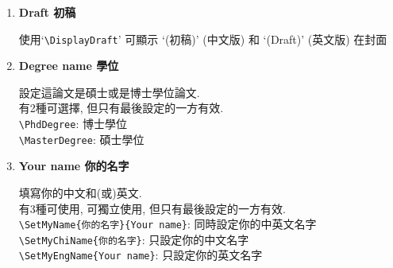 \begin{enumerate}
{    而如果覺得自動產生出來的題目斷行位置不適合, 可以手動加`\verb|\\|'來強制斷行. 如:\\
    \verb|\SetTitle{題目題目}{Title Tooooooooooo \\ Longgggggggggggg}|\\

    有3種可使用, 可獨立使用, 但只有最後設定的一方有效\\
    \verb|\SetTitle{你的題目}{Your Title}|: 同時設定中英文題目\\
    \verb|\SetChiTitle{你的題目}|: 只設定中文題目\\
    \verb|\SetEngTitle{Your Title}|: 只設定英文題目\\

    如:\\
    \verb|\SetTitle %|\\
    \verb|{中文題目中文題目} %|\\
    \verb|{Your Title Your Title}|\\
    \verb|'%'|是必須的, 是用來跟LaTex說這3行是同一句話.

    或\\
    \verb|\SetChiTitle{中文題目中文題目}|\\
    \verb|\SetEngTitle{Your Title \\ Your Title}|

    圖書館說不管你是編寫中英混合或全英文版, 都\textbf{必須}同時存在中英題目.
  } %

  \item
  {
    \textbf{Draft 初稿}

    使用`\verb|\DisplayDraft|' 可顯示 `(初稿)' (中文版) 和 `(Draft)' (英文版) 在封面
  } %

  \item
  {
    \textbf{Degree name 學位}

    設定這論文是碩士或是博士學位論文.\\
    有2種可選擇, 但只有最後設定的一方有效.\\
    \verb|\PhdDegree|: 博士學位\\
    \verb|\MasterDegree|: 碩士學位
  } %

  \item
  {
    \textbf{Your name 你的名字}

    填寫你的中文和(或)英文.\\
    有3種可使用, 可獨立使用, 但只有最後設定的一方有效.\\
    \verb|\SetMyName{你的名字}{Your name}|: 同時設定你的中英文名字\\
    \verb|\SetMyChiName{你的名字}|: 只設定你的中文名字\\
    \verb|\SetMyEngName{Your name}|: 只設定你的英文名字
  } %


\end{enumerate}
